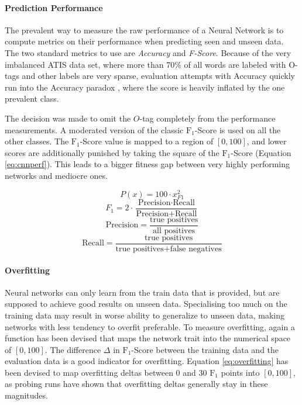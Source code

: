 \documentclass[11pt,a4paper,twoside,openright]{scrbook}
\begin{document}
\paragraph{Prediction Performance} The prevalent way to measure the raw performance of a Neural Network is to compute metrics on their performance when predicting seen and unseen data. The two standard metrics to use are \emph{Accuracy} and \emph{F-Score}. Because of the very imbalanced ATIS data set, where more than 70\% of all words are labeled with O-tags and other labels are very sparse, evaluation attempts with Accuracy quickly run into the Accuracy paradox \cite{Valverde14}, where the score is heavily inflated by the one prevalent class.

The decision was made to omit the \(O\)-tag completely from the performance measurements. A moderated version of the classic \(\text{F}_1\)-Score is used on all the other classes. The \(\text{F}_1\)-Score value is mapped to a region of \([0,100]\), and lower scores are additionally punished by taking the square of the \(\text{F}_1\)-Score (Equation \ref{eq:cnnperf}). This leads to a bigger fitness gap between very highly performing networks and mediocre ones.


\begin{equation}
  P(x) = 100 \cdot x^2_{F1} \label{eq:cnnperf}
\end{equation}
\vspace{0.2cm}
\begin{equation}
  F_1 = 2 \cdot \frac{\text{Precision} \cdot \text{Recall}}{\text{Precision} + \text{Recall}} \label{eq:f1}
\end{equation}
\vspace{0.2cm}
\begin{equation}
  \text{Precision} = \frac{\text{true\ positives}}{\text{all\ positives}} \label{eq:precision}
\end{equation}
\vspace{0.2cm}
\begin{equation}
  \text{Recall} = \frac{\text{true\ positives}}{\text{true\ positives} + \text{false\ negatives}} \label{eq:recall}
\end{equation}

\paragraph{Overfitting} Neural networks can only learn from the train data that is provided, but are supposed to achieve good results on unseen data. Specialising too much on the training data may result in worse ability to generalize to unseen data, making networks with less tendency to overfit preferable.
To measure overfitting, again a function has been devised that maps the network trait into the numerical space of \([0,100]\). The difference \(\Delta\) in \(\text{F}_1\)-Score between the training data and the evaluation data is a good indicator for overfitting. Equation \ref{eq:overfitting} has been devised to map overfitting deltas between 0 and 30 \(\text{F}_1\) points into \([0,100]\), as probing runs have shown that overfitting deltas generally stay in these magnitudes.
\end{document}
